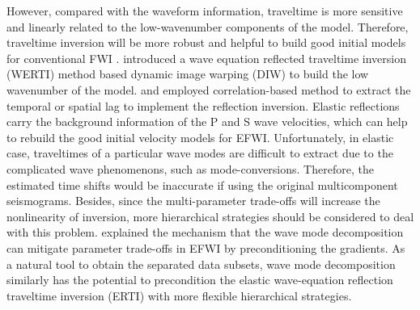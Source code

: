 However, compared with the waveform information, 
traveltime is more sensitive and linearly related to
the low-wavenumber components of the model. Therefore, traveltime inversion will be more robust and helpful to
build good initial models for conventional FWI
\cite[]{WangEtAl2014}.
\cite{Ma2013} introduced a wave equation reflected traveltime inversion (WERTI) method
based dynamic image warping (DIW) to build the low wavenumber of the model. 
\cite{Chi2015} and \cite{Wang2015} employed correlation-based method to extract the
temporal or spatial lag to implement the reflection inversion. 
Elastic reflections carry the background information of the P and S wave velocities, 
which can help to rebuild the good initial velocity models for EFWI.
Unfortunately, in elastic case, traveltimes of a particular wave modes are difficult
to extract due to the complicated wave phenomenons, such as mode-conversions.
Therefore, the estimated time shifts would be inaccurate if using the
original multicomponent seismograms.
Besides, since the multi-parameter trade-offs will increase the
nonlinearity of inversion, more hierarchical strategies should be considered to deal
with this problem.
\cite{WangEtAl2017} explained the mechanism that the wave mode decomposition can mitigate
parameter trade-offs in EFWI by preconditioning the gradients. 
As a natural tool to obtain the separated data subsets, wave mode decomposition similarly
has the potential to precondition the elastic wave-equation reflection traveltime
inversion (ERTI) with more flexible hierarchical strategies.



